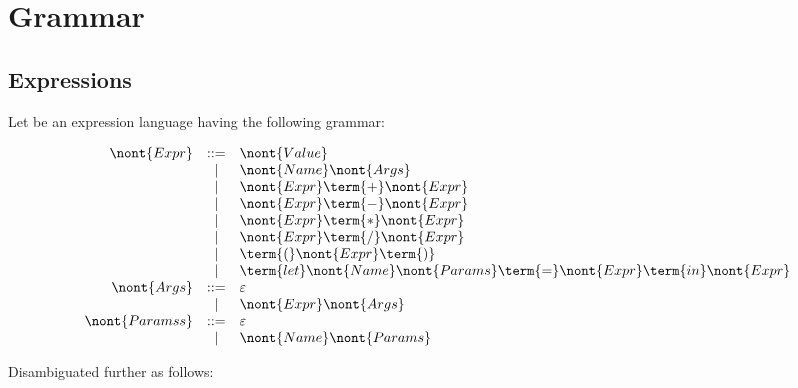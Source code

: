 \section{Grammar}

\label{section:grammar}

\subsection{Expressions}

Let  be an expression language having the following grammar:

\[\begin{array}{rclr}
\nont{Expr}     &::=& \nont{Value} \\
                & | & \nont{Name} \nont{Args} \\
                & | & \nont{Expr} \term{+} \nont{Expr} \\
                & | & \nont{Expr} \term{-} \nont{Expr} \\
                & | & \nont{Expr} \term{*} \nont{Expr} \\
                & | & \nont{Expr} \term{/} \nont{Expr} \\
                & | & \term{(} \nont{Expr} \term{)} \\
                & | & \term{let} \nont{Name} \nont{Params}%
                      \term{=} \nont{Expr} \term{in} \nont{Expr} \\
\nont{Args}     &::=& \varepsilon \\
                & | & \nont{Expr} \nont{Args} \\
\nont{Paramss}  &::=& \varepsilon \\
                & | & \nont{Name} \nont{Params}
\end{array}\]

Disambiguated further as follows:

